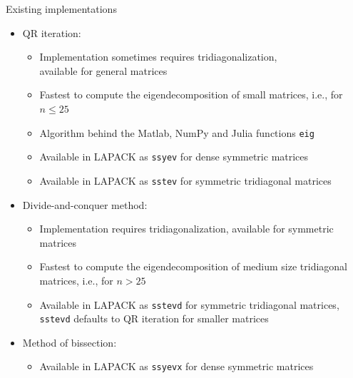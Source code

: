 \documentclass[t,usepdftitle=false]{beamer}
\begin{document}
\begin{frame}{Existing implementations}
\begin{itemize}
\item QR iteration:
\begin{itemize}
\item[-] Implementation sometimes requires tridiagonalization,\\
available for general matrices\vspace{.07cm}
\item[-] Fastest to compute the eigendecomposition of small matrices, i.e., for $n\leq 25$\vspace{.07cm}
\item[-] Algorithm behind the Matlab, NumPy and Julia functions \texttt{eig}\vspace{.07cm}
\item[-] Available in LAPACK as \texttt{ssyev} for dense symmetric matrices\vspace{.07cm}
\item[-] Available in LAPACK as \texttt{sstev} for symmetric tridiagonal matrices
\end{itemize}
\item Divide-and-conquer method:
\begin{itemize}
\item[-] Implementation requires tridiagonalization, available for symmetric matrices\vspace{.07cm}
\item[-] Fastest to compute the eigendecomposition of medium size tridiagonal matrices, i.e., for $n> 25$\vspace{.07cm}
\item[-] Available in LAPACK as \texttt{sstevd} for symmetric tridiagonal matrices,\\ \texttt{sstevd} defaults to QR iteration for smaller matrices
\end{itemize}
\item Method of bissection:
\begin{itemize}
\item[-] Available in LAPACK as \texttt{ssyevx} for dense symmetric matrices
\end{itemize}
\end{itemize}
\end{frame}

\end{document}

